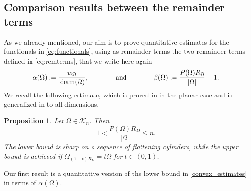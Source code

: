 \documentclass[oneside,a4paper,11pt,notitlepage]{article}
\newcommand{\abs}[1]{{\left|#1\right|}}
\theoremstyle{definition}
\theoremstyle{plain}
\newtheorem{prop}[teorema]{Proposition}
\theoremstyle{definition}
\DeclareMathOperator{\diam}{\, \textup{diam}}
\begin{document}
\subsection{Comparison results between the remainder terms}
As we already mentioned, our aim is to prove quantitative estimates for the functionals in \eqref{eq:functionals}, using as remainder terms the two remainder terms defined in \eqref{eq:remterms}, that we write here again
\begin{equation*}
\alpha(\Omega):=\frac{w_\Omega}{\diam(\Omega)}, \qquad \qquad \text{and} \qquad \qquad  \beta(\Omega):=\frac{P(\Omega)R_\Omega}{\abs{\Omega}}-1.
\end{equation*}
We recall the following estimate, which is proved in \cite{fenchel_bonnesen} in the planar case and is generalized in \cite{DBN,Kova} to all dimensions. 

\begin{prop}\label{prop:PRM-1}
Let $\Omega\in \mathcal{K}_n$. Then, 
 \begin{equation}\label{convex_estimates}
1  < \dfrac{P(\Omega) R_\Omega}{|\Omega|}  \le n. 
 \end{equation}
The lower bound is sharp on a sequence of flattening cylinders, while the upper bound is achieved if $\Omega_{(1-t)R_{\Omega}}= t \Omega $ for $t \in (0,1)$. 
\end{prop}

\noindent Our first result is a quantitative version of the lower bound in \eqref{convex_estimates} in terms of $\alpha(\Omega)$.
\end{document}
